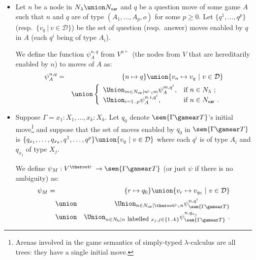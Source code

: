 \begin{definition}\hfill
\label{def:psi mapping}

    \begin{itemize}
    \item Let $n$ be a node in $N_\lambda \union N_{\sf var}$ and $q$ be a question move of some game $A$
such that $n$ and $q$ are of type $(A_1,\ldots,A_p,o)$ for some
$p\geq 0$. Let $\{ q^1, \ldots, q^p \}$ (resp.\  $\{ v_q \ | \ v \in \mathcal{D} \}$)
be the set of question (resp.\ answer) moves enabled by $q$ in $A$ (each $q^i$ being of type $A_i$).

We define the function $\psi^{n,q}_A$ from $V^{n \vdash}$
(the nodes from $V$ that are hereditarily enabled by $n$)
to moves of $A$ as:
        \begin{eqnarray*}
        \psi^{n,q}_A &=& \{ n \mapsto q \} \union  \{ v_n \mapsto v_q \ | \ v \in \mathcal{D} \}\\
         &&\union \left\{
                        \begin{array}{ll}
                          \Union_{m \in N_{\sf var} | n \vdash_i m} \psi^{m, q^i}_A, & \hbox{if $n\in N_{\lambda}$\ ;} \\
                          \Union_{i=1..p} \psi^{n.i, q^i}_A, & \hbox{if $n\in N_{\sf var}$\ .}
                        \end{array}
                      \right.
        \end{eqnarray*}

    \item Suppose $\Gamma = x_1:X_1, \ldots ,
    x_k:X_k$. Let $q_0$ denote $\sem{\Gamma\gamear T}$'s
    initial move\footnote{Arenas involved in the game semantics
    of simply-typed $\lambda$-calculus are all trees: they have
    a single initial move.} and suppose that the set of moves
    enabled by $q_0$ in $\sem{\Gamma\gamear T}$ is
     $\{ q_{x_1}, \ldots, q_{x_k}, q^1, \ldots, q^p \} \union \{
    v_q \ | \ v \in \mathcal{D} \}$ where each $q^i$ is of type
    $A_i$ and $q_{x_j}$ of type $X_j$.

    We define $\psi_M : V^{\theroot\vdash} \rightarrow
    \sem{\Gamma\gamear T}$ (or just $\psi$ if there is
    no ambiguity) as:
    \begin{eqnarray*}
     \psi_M = && \{ r \mapsto q_0 \}  \union  \{ v_r \mapsto v_{q_0} \ | \ v \in \mathcal{D} \}\\
& \union& \Union_{n \in N_{\sf var} | \theroot\vdash_i n} \psi^{n, q^i}_\sem{\Gamma\gamear T} \\
& \union& \Union_{n \in N_{\sf fv} | n \mbox{ \small labelled } x_j, j \in \{ 1..k \} } \psi^{n, q_{x_j}}_\sem{\Gamma\gamear T} \ .
    \end{eqnarray*}
    \end{itemize}
\end{definition}

